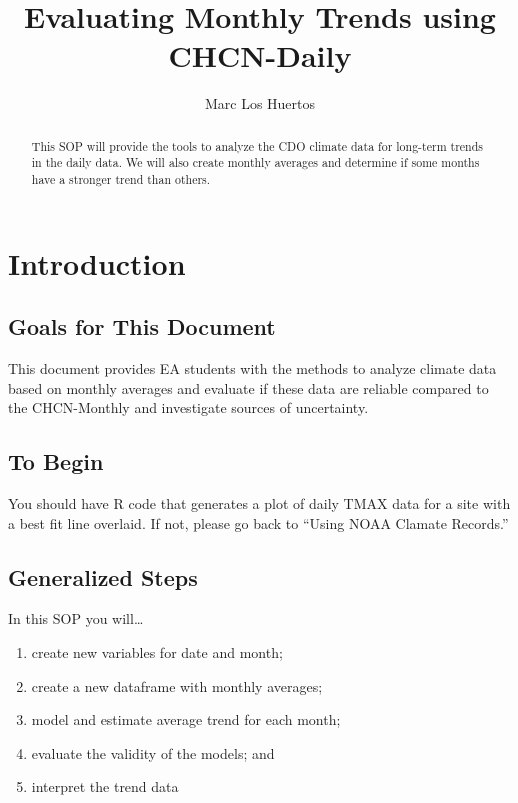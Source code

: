 \documentclass{article}\usepackage[]{graphicx}\usepackage[]{color}
\title{Evaluating Monthly Trends using CHCN-Daily}
\author{Marc Los Huertos}
\begin{document}
\maketitle
\tableofcontents

\begin{abstract}
\noindent This SOP will provide the tools to analyze the CDO climate data for long-term trends in the daily data. We will also create monthly averages and determine if some months have a stronger trend than others.   

\end{abstract}


\section{Introduction}

\subsection{Goals for This Document}

This document provides EA students with the methods to analyze climate data based on monthly averages and evaluate if these data are reliable compared to the CHCN-Monthly and investigate sources of uncertainty. 

\subsection{To Begin}

You should have R code that generates a plot of daily TMAX data for a site with a best fit line overlaid. If not, please go back to ``Using NOAA Clamate Records.''


\subsection{Generalized Steps}

In this SOP you will\ldots

\begin{enumerate}
  \item create new variables for date and month;
  \item create a new dataframe with monthly averages;
  \item model and estimate average trend for each month;
  \item evaluate the validity of the models; and
  \item interpret the trend data
\end{enumerate}
\end{document}
